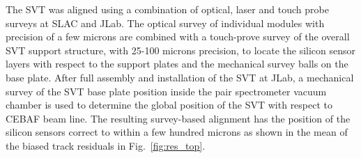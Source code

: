 
The SVT was aligned using a combination of optical, laser and touch probe surveys at SLAC and JLab. The 
optical survey of individual modules with precision of a few microns are combined with a touch-prove survey 
of the overall SVT support structure, with 25-100 microns precision, to locate the silicon sensor layers with 
respect to the support plates and the mechanical survey balls on the base plate.
After full assembly and installation of the SVT at JLab, a mechanical survey of the SVT base plate position 
inside the pair spectrometer vacuum chamber is used to determine the global position of the SVT with respect 
to CEBAF beam line. 
The resulting survey-based alignment has the position of the silicon sensors correct to within a few hundred 
microns as shown in the mean of the biased track residuals in Fig.~\ref{fig:res_top}.  
